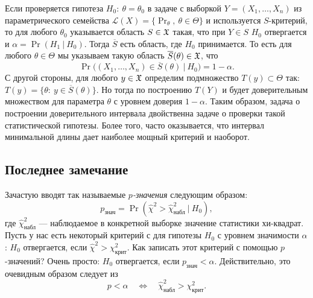 Если проверяется гипотеза $H_0:\ \theta = \theta_0$ в задаче с выборкой
$Y = (X_1, \ldots, X_n)$ из параметрического семейства $\mathcal{L}(X) =
\{\Pr_\theta,\ \theta \in \Theta\}$ и используется $S$-критерий, то
для любого $\theta_0$ указывается область $S \in \mathfrak{X}$ такая, что при $Y
\in S$ $H_0$ отвергается и $\alpha = \Pr(H_1\ |\ H_0)$. Тогда $\overline{S}$
есть область, где $H_0$ принимается. То есть для любого $\theta \in \Theta$
мы указываем такую область $\overline{S}(\theta) \in \mathfrak{X}$, что
\[
    \Pr\big( (X_1, \ldots, X_n) \in \overline{S}(\theta)\ |\ H_0 \big) =
    1 - \alpha.
    \]
С другой стороны, для любого $y \in \mathfrak{X}$ определим подмножество $T(y) \subset
\Theta$ так: $T(y) = \{\theta:\ y \in \overline{S}(\theta)\}$. Но тогда
по построению $T(Y)$ и будет доверительным множеством для параметра $\theta$
с уровнем доверия $1 - \alpha$. Таким образом, задача о построении
доверительного интервала двойственна задаче о проверки такой статистической
гипотезы. Более того, часто оказывается, что интервал минимальной длины
дает наиболее мощный критерий и наоборот.

\subsection{Последнее замечание}
Зачастую вводят так называемые \emph{$p$-значения} следующим образом:
\[
    p_{\text{знач}} = \Pr(\hat{\chi}^2 > \hat{\chi}^2_{\text{набл}}\ |\ H_0),
    \]
где $\hat{\chi}^2_{\text{набл}}$ --- наблюдаемое в конкретной выборке
значение статистики хи-квадрат. Пусть у нас есть некоторый критерий с для
гипотезы $H_0$ с уровнем значимости $\alpha$: $H_0$ отвергается, если
$\hat{\chi}^2 > \chi^2_{\text{крит}}$. Как записать этот критерий с помощью
$p$-значений? Очень просто: $H_0$ отвергается, если $p_{\text{знач}} < \alpha$.
Действительно, это очевидным образом следует из
\[
    p < \alpha \quad \Longleftrightarrow \quad \hat{\chi}^2_{\text{набл}}
    > \chi^2_{\text{крит}}.
    \]

